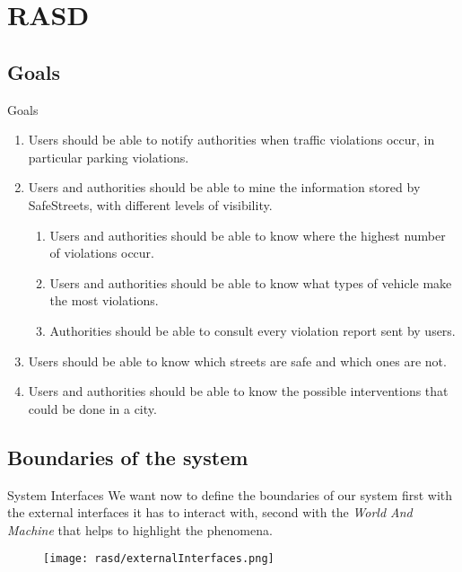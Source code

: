 \section{RASD}

	\subsection{Goals}
		\begin{frame}{Goals}
			\vspace{-17pt}
			\begin{enumerate}[label=\textbf{G\arabic*}]\small
				\item \label{goal:notification} Users should be able to notify authorities when traffic violations occur, in particular parking violations.
				\item \label{goal:mining} Users and authorities should be able to mine the information stored by SafeStreets, with different levels of visibility.
				\begin{enumerate}[label=\textbf{G2\Alph*}]
					\item \label{goal:miningA} Users and authorities should be able to know where the highest number of violations occur.
					\item \label{goal:miningB} Users and authorities should be able to know what types of vehicle make the most violations.
					\item \label{goal:miningC} Authorities should be able to consult every violation report sent by users.
				\end{enumerate}
				\item \label{goal:safety} Users should be able to know which streets are safe and which ones are not.
				\item \label{goal:intervention} Users and authorities should be able to know the possible interventions that could be done in a city.
			\end{enumerate}
		\end{frame}

	\subsection{Boundaries of the system}
		\begin{frame}{System Interfaces}
			We want now to define the boundaries of our system first with the external interfaces it has to interact with, second with the \emph{World And Machine} that helps to highlight the phenomena.
			
			\begin{figure}[h!]
				\centering
				\texttt{[image: rasd/externalInterfaces.png]}
			\end{figure}
		\end{frame}
		
